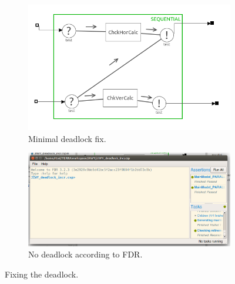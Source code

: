 \documentclass[a4paper,twoside,11pt]{article}
\begin{document}
\begin{figure}
	\begin{subfigure}{0.6\textwidth}
		\centering
		\includegraphics[width=\textwidth]{./images/4-2_contr.png}
		\caption{Minimal deadlock fix.}
		\label{sub:4_2_check}
	\end{subfigure}

	\begin{subfigure}{0.8\textwidth}
		\centering
		\includegraphics[width=\textwidth]{./images/4-2_fdr.png}
		\caption{No deadlock according to FDR.}
		\label{sub:4_2_fdr}
	\end{subfigure}
	\caption{Fixing the deadlock.}
\end{figure}
\end{document}
